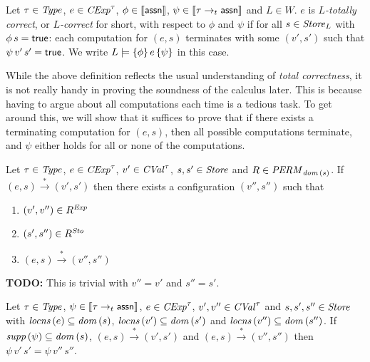 \documentclass[12pt,a4paper]{report}
\newcommand{\CExp}{\nstyle{CExp}}
\newcommand{\CVal}{\nstyle{CVal}}
\newcommand{\Sto}{\nstyle{Sto}}
\newcommand{\PERM}{\nstyle{PERM}}
\begin{document}
\begin{definition}
  Let $\tau\in\mathit{Type}$, $e\in\CExp^\tau$, $\phi\in\llbracket\mathsf{assn}\rrbracket$, $\psi\in\llbracket\tau\rightarrow_t\mathsf{assn}\rrbracket$
  and $L\in W$. $e$ is {\em $L$-totally correct}, or {\em $L$-correct} for short, with respect to $\phi$ and
  $\psi$ if for all $s\in\mathit{Store}_L$ with $\phi\,s=\mathsf{true}$: each computation for $(e,s)$ terminates with some
  $(v',s')$ such that $\psi\,v'\,s'=\mathsf{true}$. We write $L \models \{\phi\}\,e\,\{\psi\}$ in this case.
\end{definition}

While the above definition reflects the usual understanding of {\em total correctness}, it is not really handy
in proving the soundness of the calculus later. This is because having to argue about all computations each
time is a tedious task. To get around this, we will show that it suffices to prove that if there exists a
terminating computation for $(e,s)$, then all possible computations terminate, and $\psi$ either holds for all
or none of the computations.

\begin{lemma}
  Let $\tau\in\mathit{Type}$, $e\in\CExp^\tau$, $v'\in\CVal^\tau$, $s,s'\in\mathit{Store}$
  and $R \in \PERM_{\dom{s}}$. If $(e,s)\xrightarrow*(v',s')$ then there
  exists a configuration $(v'',s'')$ such that
  \begin{enumerate}
    \item $(v',v'')\in R^{\mathit{Exp}}$
    \item $(s',s'')\in R^\Sto$
    \item $(e,s) \xrightarrow* (v'',s'')$
  \end{enumerate}
\end{lemma}

{\bf TODO:} This is trivial with $v'' = v'$ and $s'' = s'$.

\begin{lemma}
  Let $\tau\in\mathit{Type}$, $\psi\in\llbracket\tau\rightarrow_t\mathsf{assn}\rrbracket$,
  $e\in\CExp^\tau$, $v',v''\in\CVal^\tau$ and $s,s',s''\in\mathit{Store}$
  with $\mathit{locns}\,(e)\subseteq \mathit{dom}\,(s)$, $\mathit{locns}\,(v')\subseteq\mathit{dom}\,(s')$
  and $\mathit{locns}\,(v'')\subseteq \mathit{dom}\,(s'')$.
  If $\mathit{supp}\,(\psi) \subseteq \mathit{dom}\,(s)$, $(e,s)\xrightarrow*(v',s')$
  and $(e,s)\xrightarrow*(v'',s'')$ then $\psi\,v'\,s'=\psi\,v''\,s''$.
\end{lemma}
\end{document}
